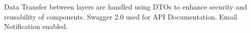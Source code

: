 \documentclass[]{deedy-resume-openfont}
\begin{document}
\begin{minipage}[t]{0.66\textwidth}
\begin{tightemize}
\item Data Transfer between layers are handled using DTOs to enhance security and reusability of components. Swagger 2.0 used for API Documentation. Email Notification enabled.
\end{tightemize}
\sectionsep








\end{minipage}
\end{document}

